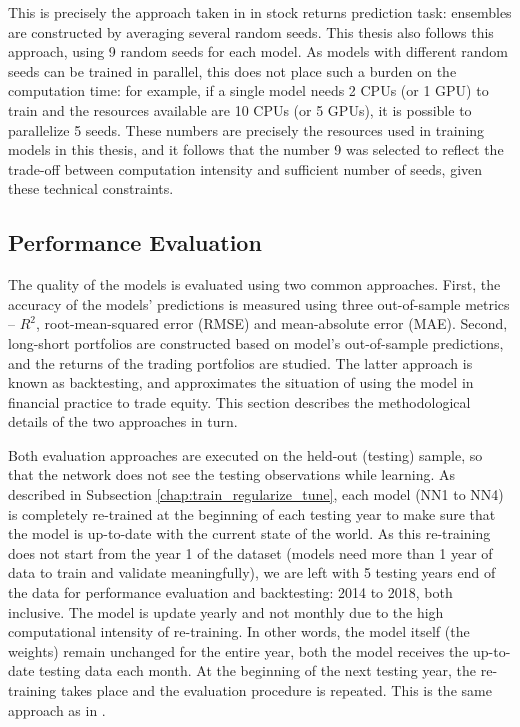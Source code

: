 		This is precisely the approach taken in \cite{gu2020empirical} in stock returns prediction task: ensembles are constructed by averaging several random seeds. This thesis also follows this approach, using 9 random seeds for each model. As models with different random seeds can be trained in parallel, this does not place such a burden on the computation time: for example, if a single model needs 2 CPUs (or 1 GPU) to train and the resources available are 10 CPUs (or 5 GPUs), it is possible to parallelize 5 seeds. These numbers are precisely the resources used in training models in this thesis, and it follows that the number 9 was selected to reflect the trade-off between computation intensity and sufficient number of seeds, given these technical constraints.

	\subsection{Performance Evaluation}
		The quality of the models is evaluated using two common approaches. First, the accuracy of the models' predictions is measured using three out-of-sample metrics – $R^2$, root-mean-squared error (RMSE) and mean-absolute error (MAE). Second, long-short portfolios are constructed based on model's out-of-sample predictions, and the returns of the trading portfolios are studied. The latter approach is known as backtesting, and approximates the situation of using the model in financial practice to trade equity. This section describes the methodological details of the two approaches in turn. 
		
		Both evaluation approaches are executed on the held-out (testing) sample, so that the network does not see the testing observations while learning. As described in Subsection \ref{chap:train_regularize_tune}, each model (NN1 to NN4) is completely re-trained at the beginning of each testing year to make sure that the model is up-to-date with the current state of the world. As this re-training does not start from the year 1 of the dataset (models need more than 1 year of data to train and validate meaningfully), we are left with 5 testing years end of the data for performance evaluation and backtesting: 2014 to 2018, both inclusive. The model is update yearly and not monthly due to the high computational intensity of re-training. In other words, the model itself (the weights) remain unchanged for the entire year, both the model receives the up-to-date testing data each month. At the beginning of the next testing year, the re-training takes place and the evaluation procedure is repeated. This is the same approach as in \cite{gu2020empirical, tobek2020does}.
		
